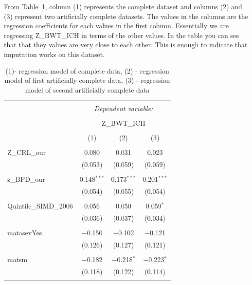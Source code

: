 \documentclass[bsc]{abdnthesis}
\begin{document}
 From Table~\ref{abdn-models}, column (1) represents the complete dataset and columns (2) and (3) represent two artificially complete datasets. The values in the columns are the regression coefficients for each values in the first column. Essentially we are regressing Z\_BWT\_ICH in terms of the other values. In the table you can see that that they values are very close to each other. This is enough to indicate that imputation works on this dataset.

\begin{table}[H] \centering 
  \caption{(1)- regression model of complete data, (2) - regression model of first artificially complete data, (3) - regression model of second artificially complete data} 
  \label{abdn-models} 
\begin{tabular}{@{\extracolsep{5pt}}lccc} 
\\[-1.8ex]\hline 
\hline \\[-1.8ex] 
 & \multicolumn{3}{c}{\textit{Dependent variable:}} \\ 
\cline{2-4} 
\\[-1.8ex] & \multicolumn{3}{c}{Z\_BWT\_ICH} \\ 
\\[-1.8ex] & (1) & (2) & (3)\\ 
\hline \\[-1.8ex] 
 Z\_CRL\_our & 0.080 & 0.031 & 0.023 \\ 
  & (0.053) & (0.059) & (0.059) \\ 
  & & & \\ 
 z\_BPD\_our & 0.148$^{***}$ & 0.173$^{***}$ & 0.201$^{***}$ \\ 
  & (0.054) & (0.055) & (0.054) \\ 
  & & & \\ 
 Quintile\_SIMD\_2006 & 0.056 & 0.050 & 0.059$^{*}$ \\ 
  & (0.036) & (0.037) & (0.034) \\ 
  & & & \\ 
 matasevYes & $-$0.150 & $-$0.102 & $-$0.121 \\ 
  & (0.126) & (0.127) & (0.121) \\ 
  & & & \\ 
 matsm & $-$0.182 & $-$0.218$^{*}$ & $-$0.223$^{*}$ \\ 
  & (0.118) & (0.122) & (0.114) \\ 
  & & & \\ 

\end{tabular}
\end{table}
\end{document}
